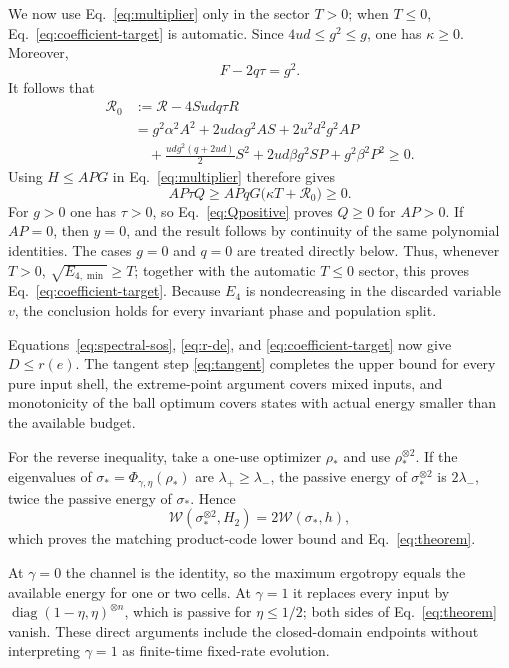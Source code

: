 \documentclass[pra,aps,twocolumn,nofootinbib,superscriptaddress]{revtex4-2}
\newcommand{\W}{\mathcal{W}}
\begin{document}
We now use Eq.~\eqref{eq:multiplier} only in the sector $T>0$; when
$T\leq0$, Eq.~\eqref{eq:coefficient-target} is automatic.  Since
$4ud\leq g^2\leq g$, one has $\kappa\geq0$.  Moreover,
\begin{equation}
F-2q\tau=g^2.
\end{equation}
It follows that
\begin{align}
\mathcal R_0&:=\mathcal R-4Sudq\tau R\nonumber\\
&=g^2\alpha^2A^2+2ud\alpha g^2AS+2u^2d^2g^2AP\nonumber\\
&\quad+\frac{udg^2(q+2ud)}{2}S^2
+2ud\beta g^2SP+g^2\beta^2P^2\geq0.
\label{eq:R0}
\end{align}
Using $H\leq APG$ in Eq.~\eqref{eq:multiplier} therefore gives
\begin{equation}
AP\tau Q\geq APqG\bigl(\kappa T+\mathcal R_0\bigr)\geq0.
\label{eq:Qpositive}
\end{equation}
For $g>0$ one has $\tau>0$, so Eq.~\eqref{eq:Qpositive} proves $Q\geq0$
for $AP>0$.  If $AP=0$, then $y=0$, and the result follows by continuity of
the same polynomial identities.  The cases $g=0$ and $q=0$ are treated
directly below.  Thus, whenever $T>0$,
$\sqrt{E_{4,\min}}\geq T$; together with the automatic $T\leq0$ sector, this
proves Eq.~\eqref{eq:coefficient-target}.  Because $E_4$ is nondecreasing in
the discarded variable $v$, the conclusion holds for every invariant phase
and population split.

Equations~\eqref{eq:spectral-sos}, \eqref{eq:r-de}, and
\eqref{eq:coefficient-target} now give $D\leq r(e)$.  The tangent step
\eqref{eq:tangent} completes the upper bound for every pure input shell, the
extreme-point argument covers mixed inputs, and monotonicity of the ball
optimum covers states with actual energy smaller than the available budget.

For the reverse inequality, take a one-use optimizer $\rho_*$ and use
$\rho_*^{\otimes2}$.  If the eigenvalues of
$\sigma_*=\Phi_{\gamma,\eta}(\rho_*)$ are $\lambda_+\geq\lambda_-$, the
passive energy of $\sigma_*^{\otimes2}$ is $2\lambda_-$, twice the passive
energy of $\sigma_*$.  Hence
\begin{equation}
\W(\sigma_*^{\otimes2},H_2)=2\W(\sigma_*,h),
\end{equation}
which proves the matching product-code lower bound and
Eq.~\eqref{eq:theorem}.

At $\gamma=0$ the channel is the identity, so the maximum ergotropy equals
the available energy for one or two cells.  At $\gamma=1$ it replaces every
input by $\operatorname{diag}(1-\eta,\eta)^{\otimes n}$, which is passive for
$\eta\leq1/2$; both sides of Eq.~\eqref{eq:theorem} vanish.  These direct
arguments include the closed-domain endpoints without interpreting
$\gamma=1$ as finite-time fixed-rate evolution.
\end{document}
